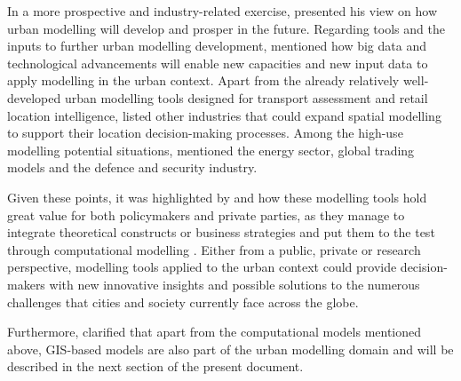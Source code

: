 \documentclass[12pt, a4paper]{report}
\begin{document}
In a more prospective and industry-related exercise, \cite{wilsonFutureUrbanModelling2018} presented his view on how urban modelling will develop and prosper in the future. Regarding tools and the inputs to further urban modelling development, \cite{wilsonFutureUrbanModelling2018} mentioned how big data and technological advancements will enable new capacities and new input data to apply modelling in the urban context. Apart from the already relatively well-developed urban modelling tools designed for transport assessment and retail location intelligence, \cite{wilsonFutureUrbanModelling2018} listed other industries that could expand spatial modelling to support their location decision-making processes. Among the high-use modelling potential situations, \cite{wilsonFutureUrbanModelling2018} mentioned the energy sector, global trading models and the defence and security industry.


Given these points, it was highlighted by \cite{battyUrbanModeling2009a} and \cite{wilsonFutureUrbanModelling2018} how these modelling tools hold great value for both policymakers and private parties, as they manage to integrate theoretical constructs or business strategies and put them to the test through computational modelling \citep{battyUrbanModeling2009a}. Either from a public, private or research perspective, modelling tools applied to the urban context could provide decision-makers with new innovative insights and possible solutions to the numerous challenges that cities and society currently face across the globe.

Furthermore, \cite{battyUrbanModeling2009a} clarified that apart from the computational models mentioned above, GIS-based models are also part of the urban modelling domain and will be described in the next section of the present document.





\end{document}
